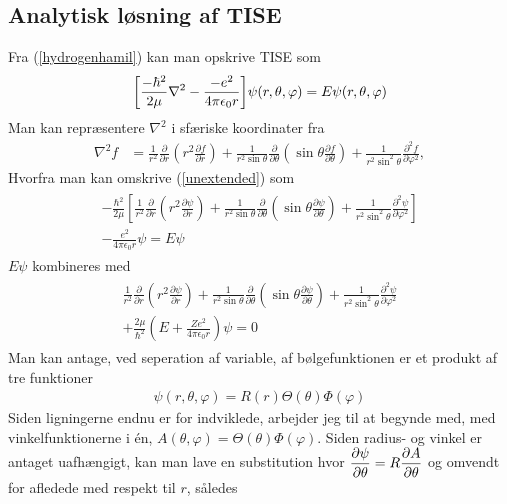 \documentclass[12pt]{article}
\theoremstyle{definition}
\theoremstyle{remark}
\theoremstyle{definition}
\numberwithin{equation}{section}
\begin{document}
\subsection{Analytisk løsning af TISE}
Fra (\ref{hydrogenhamil}) kan man opskrive TISE som
\begin{align}
\label{unextended}
    \qty[\frac{-\hbar^2}{2\mu}\nabla^2 - \frac{-e^2}{4\pi \epsilon_0 r}]\psi(r,\theta,\varphi)=E\psi(r,\theta,\varphi)
\end{align}
Man kan repræsentere $\nabla^2$ i sfæriske koordinater fra
\begin{align}
\nabla^2f &= \frac{1}{r^2} \frac{\partial}{\partial r} \left(r^2 \frac{\partial f}{\partial r} \right) + \frac{1}{r^2 \sin \theta} \frac{\partial}{\partial \theta} \left(\sin \theta \frac{\partial f}{\partial \theta} \right) + \frac{1}{r^2 \sin^2 \theta} \frac{\partial^2 f}{\partial \varphi^2},
\end{align}
Hvorfra man kan omskrive (\ref{unextended}) som
\begin{align}
    \begin{split}
         -\frac{\hbar^2}{2 \mu} \left[ \frac{1}{r^2} \frac{\partial}{\partial r} \left( r^2 \frac{\partial \psi}{\partial r} \right) + \frac{1}{r^2 \sin \theta} \frac{\partial}{\partial \theta} \left( \sin \theta \frac{\partial \psi}{\partial \theta} \right) + \frac{1}{r^2 \sin^2 \theta} \frac{\partial^2 \psi}{\partial \varphi^2} \right]\\
         - \frac{e^2}{4 \pi \epsilon_0 r} \psi = E \psi
    \end{split}
\end{align}
$E\psi$ kombineres med 
\begin{align}
\begin{split}
    \frac{1}{r^2}\frac{\partial}{\partial r}\left(r^2\frac{\partial\psi}{\partial r}\right)+\frac{1}{r^2\sin\theta}\frac{\partial}{\partial\theta}\left(\sin\theta\frac{\partial\psi}{\partial\theta}\right)+\frac{1}{r^2\sin^2\theta}\frac{\partial^2\psi}{\partial\varphi^2}\\+\frac{2\mu}{\hbar^2}\left(E+\frac{Ze^2}{4\pi\epsilon_0r}\right)\psi=0
\end{split}
\end{align}
Man kan antage, ved seperation af variable, af bølgefunktionen er et produkt af tre funktioner
\begin{align}
\label{opdeling}
    \psi(r, \theta, \varphi) = R(r)\Theta (\theta) \Phi (\varphi)
\end{align}
Siden ligningerne endnu er for indviklede, arbejder jeg til at begynde med, med vinkelfunktionerne i én, $A(\theta, \varphi) = \Theta(\theta)\Phi(\varphi)$. Siden radius- og vinkel er antaget uafhængigt, kan man lave en substitution hvor $\displaystyle \pdv{\psi}{\theta} = R\pdv{A}{\theta}$ og omvendt for afledede med respekt til $r$, således
\end{document}
